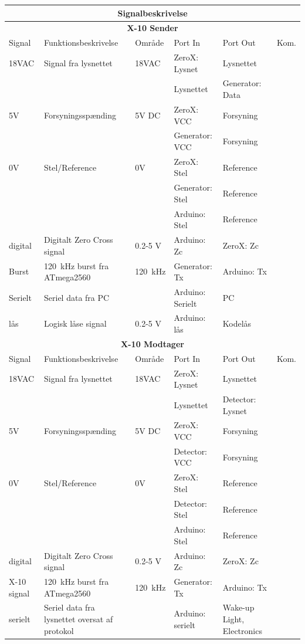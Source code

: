 \documentclass[11pt]{article}
\begin{document}
\begin{table}[H]
\centering
	\begin{tabularx}{\textwidth}{X|p{4cm}|X|p{2.9cm}|p{2.9cm}|X}

	\toprule[0.4mm] \midrule \multicolumn{6}{c}{\textbf{Signalbeskrivelse}}\\
	\midrule \toprule[0.4mm] \multicolumn{6}{c}{\textbf{X-10 Sender}}\\
	\midrule[0.4mm] Signal & Funktionsbeskrivelse & Område & Port In & Port Out & Kom.\\ 
	\midrule[0.3mm]
	18VAC & Signal fra lysnettet & 18VAC & ZeroX: Lysnet & Lysnettet &\\
	& & & Lysnettet & Generator: Data &\\
	\midrule
	5V & Forsyningsspænding & 5V DC & ZeroX: VCC & Forsyning &\\
	&  &  & Generator: VCC & Forsyning &\\
	\midrule
	0V & Stel/Reference & 0V & ZeroX: Stel & Reference &\\
	&  &  & Generator: Stel & Reference &\\
	&  &  & Arduino: Stel & Reference &\\
	\midrule
	digital & Digitalt Zero Cross signal & 0.2-5 V & Arduino: Zc & ZeroX: Zc &\\
	\midrule
	Burst & \SI{120}{\kilo \Hz} burst fra ATmega2560 & \SI{120}{\kilo \Hz} & Generator: Tx & Arduino: Tx &\\
	\midrule
	Serielt & Seriel data fra PC &  & Arduino: Serielt & PC &\\
	\midrule
	lås & Logisk låse signal & 0.2-5 V & Arduino: lås & Kodelås &\\
	\midrule[0.4mm] \multicolumn{6}{c}{\textbf{X-10 Modtager}}\\
	\midrule[0.4mm] Signal & Funktionsbeskrivelse & Område & Port In & Port Out & Kom.\\ \midrule[0.3mm]
	18VAC & Signal fra lysnettet & 18VAC & ZeroX: Lysnet & Lysnettet &\\
	& & & Lysnettet & Detector: Lysnet &\\
	\midrule
	5V & Forsyningsspænding & 5V DC & ZeroX: VCC & Forsyning &\\
	&  &  & Detector: VCC & Forsyning &\\
	\midrule
	0V & Stel/Reference & 0V & ZeroX: Stel & Reference &\\
	&  &  & Detector: Stel & Reference &\\
	&  &  & Arduino: Stel & Reference &\\
	\midrule
	digital & Digitalt Zero Cross signal & 0.2-5 V & Arduino: Zc & ZeroX: Zc &\\
	\midrule
	X-10 signal & \SI{120}{\kilo \Hz} burst fra ATmega2560 & \SI{120}{\kilo \Hz} & Generator: Tx & Arduino: Tx &\\
	\midrule
	serielt & Seriel data fra lysnettet oversat af protokol &  & Arduino: serielt & Wake-up Light, Electronics &\\
	\midrule\bottomrule[0.4mm]



\end{tabularx}
\end{table}
\end{document}
